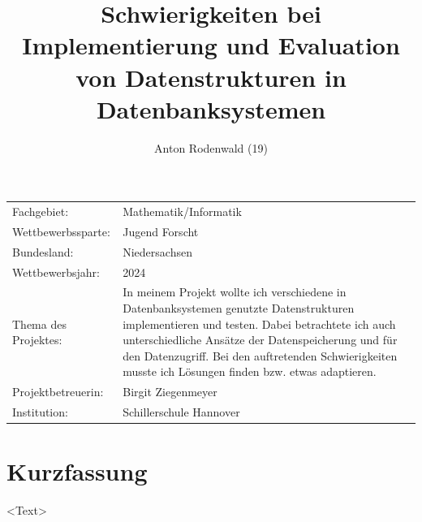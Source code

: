 \documentclass[11pt,a4paper]{article}
\begin{document}
\title{Schwierigkeiten bei Implementierung und Evaluation von Datenstrukturen in Datenbanksystemen}
\author{Anton Rodenwald (19)}
\maketitle

\addtocounter{page}{-3}
\thispagestyle{empty}

\large
\begin{tabular}{l p{12cm}}

    Fachgebiet:          & Mathematik/Informatik      \\

    Wettbewerbssparte:   & Jugend Forscht             \\

    Bundesland:          & Niedersachsen              \\

    Wettbewerbsjahr:     & 2024                       \\

    Thema des Projektes: &
    In meinem Projekt wollte ich verschiedene in Datenbanksystemen genutzte Datenstrukturen
    implementieren und testen. Dabei betrachtete ich auch unterschiedliche Ansätze der
    Datenspeicherung und für den Datenzugriff. Bei den auftretenden Schwierigkeiten
    musste ich Lösungen finden bzw. etwas adaptieren. \\

    Projektbetreuerin:   & Birgit Ziegenmeyer         \\

    Institution:         & Schillerschule Hannover    \\
\end{tabular}

\clearpage

\pagestyle{empty}


\section*{Kurzfassung}

<Text>

\clearpage


\renewcommand*\contentsname{Inhaltsverzeichnis}

\renewcommand{\cftdot}{}

\tableofcontents
\end{document}
